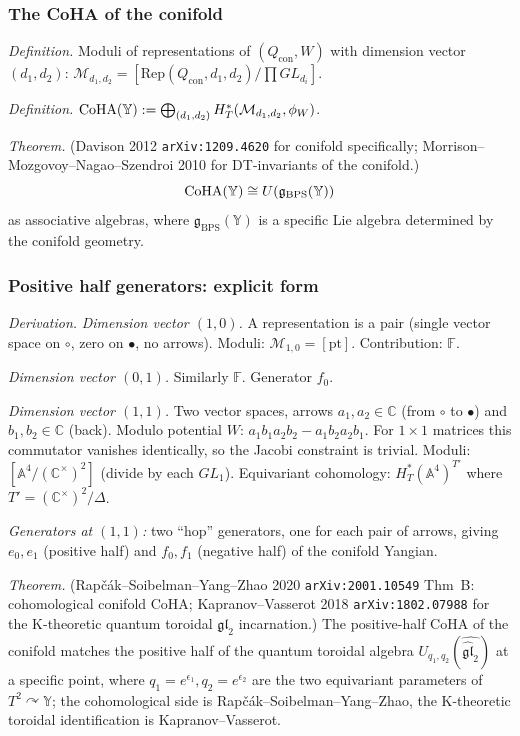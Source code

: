 \subsubsection{The CoHA of the conifold}

\emph{Definition.} Moduli of representations of $(Q_{\mathrm{con}}, W)$ with dimension
vector $(d_1, d_2)$: $\mathcal{M}_{d_1, d_2} = [\mathrm{Rep}(Q_{\mathrm{con}}, d_1, d_2) / \prod GL_{d_i}]$.

\emph{Definition.} $\mathrm{CoHA}(\mathbb{Y}) := \bigoplus_{(d_1, d_2)} H^*_T(\mathcal{M}_{d_1, d_2}, \phi_W)$.

\emph{Theorem.} (Davison 2012 \texttt{arXiv:1209.4620} for conifold specifically;
Morrison--Mozgovoy--Nagao--Szendroi 2010 for DT-invariants of the conifold.)
\[
\mathrm{CoHA}(\mathbb{Y}) \cong U(\mathfrak{g}_{\mathrm{BPS}}(\mathbb{Y}))
\]
as associative algebras, where $\mathfrak{g}_{\mathrm{BPS}}(\mathbb{Y})$ is a specific
Lie algebra determined by the conifold geometry.

\subsubsection{Positive half generators: explicit form}

\emph{Derivation.} \emph{Dimension vector $(1, 0)$.}
A representation is a pair (single vector space on $\circ$, zero on $\bullet$, no arrows).
Moduli: $\mathcal{M}_{1, 0} = [\mathrm{pt}]$. Contribution: $\mathbb{F}$.

\emph{Dimension vector $(0, 1)$.} Similarly $\mathbb{F}$. Generator $f_0$.

\emph{Dimension vector $(1, 1)$.}
Two vector spaces, arrows $a_1, a_2 \in \mathbb{C}$ (from $\circ$ to $\bullet$) and
$b_1, b_2 \in \mathbb{C}$ (back). Modulo potential $W$: $a_1 b_1 a_2 b_2 - a_1 b_2 a_2 b_1$.
For $1 \times 1$ matrices this commutator vanishes identically, so the Jacobi
constraint is trivial. Moduli: $[\mathbb{A}^4 / (\mathbb{C}^\times)^2]$ (divide by each
$GL_1$).
Equivariant cohomology: $H^*_T(\mathbb{A}^4)^{T'}$ where $T' = (\mathbb{C}^\times)^2/\Delta$.

\emph{Generators at $(1, 1)$:} two ``hop'' generators, one for each pair of arrows,
giving $e_0, e_1$ (positive half) and $f_0, f_1$ (negative half) of the conifold Yangian.

\emph{Theorem.} (Rapčák--Soibelman--Yang--Zhao 2020 \texttt{arXiv:2001.10549} Thm~B:
cohomological conifold CoHA; Kapranov--Vasserot 2018 \texttt{arXiv:1802.07988} for the
K-theoretic quantum toroidal $\mathfrak{gl}_2$ incarnation.) The positive-half CoHA of the
conifold matches the positive half of the quantum toroidal algebra
$U_{q_1, q_2}(\widehat{\widehat{\mathfrak{gl}}_2})$ at a specific point, where
$q_1 = e^{\epsilon_1}, q_2 = e^{\epsilon_2}$ are the two equivariant parameters of
$T^2 \curvearrowright \mathbb{Y}$; the cohomological side is Rapčák--Soibelman--Yang--Zhao,
the K-theoretic toroidal identification is Kapranov--Vasserot.

